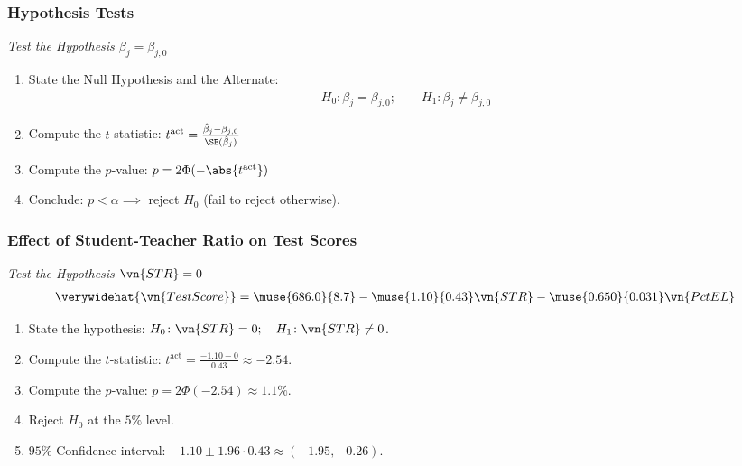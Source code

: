 

\begin{frame}
\frametitle{Hypothesis Tests}
\emph{Test the Hypothesis $\beta_{j}=\beta_{j,0}$}
\begin{enumerate}
\item State the Null Hypothesis and the Alternate:
\begin{align*}
H_{0}\colon \beta_{j}=\beta_{j,0}; 
\qquad 
H_{1}\colon \beta_{j}\ne\beta_{j,0}
\end{align*}
\item Compute the $t$-statistic: \quad $t^{\text{act}}=\frac{\hat{\beta}_{j}-\beta_{j,0}}{\SE(\hat{\beta}_{j})}$
\item Compute the $p$-value: \quad $p=2\Phi(-\abs{t^{\text{act}}})$
\item Conclude: \quad $p<\alpha \implies$ reject $H_{0}$ \quad (fail to reject otherwise).
\end{enumerate}
\end{frame}


\begin{frame}
\frametitle{Effect of Student-Teacher Ratio on Test Scores}
\emph{Test the Hypothesis $\vn{STR}=0$}
\begin{align*}
\verywidehat{\vn{TestScore}}
  = \muse{686.0}{8.7} - \muse{1.10}{0.43} \vn{STR}
                      - \muse{0.650}{0.031} \vn{PctEL}
\end{align*}
\begin{enumerate}
\item State the hypothesis:
\quad $H_{0}\colon \vn{STR}=0; \quad H_{1}\colon \vn{STR}\ne0$.
\item Compute the $t$-statistic: 
\quad $t^{\text{act}}=\frac{-1.10-0}{0.43}\approx-2.54$.
\item Compute the $p$-value: 
\quad $p=2\Phi(-2.54)\approx 1.1\%$.
\item Reject $H_{0}$ at the $5\%$ level.
\item $95\%$ Confidence interval:
\quad $-1.10 \pm 1.96 \cdot 0.43 \approx (-1.95, -0.26)$.
\end{enumerate}
\end{frame}


